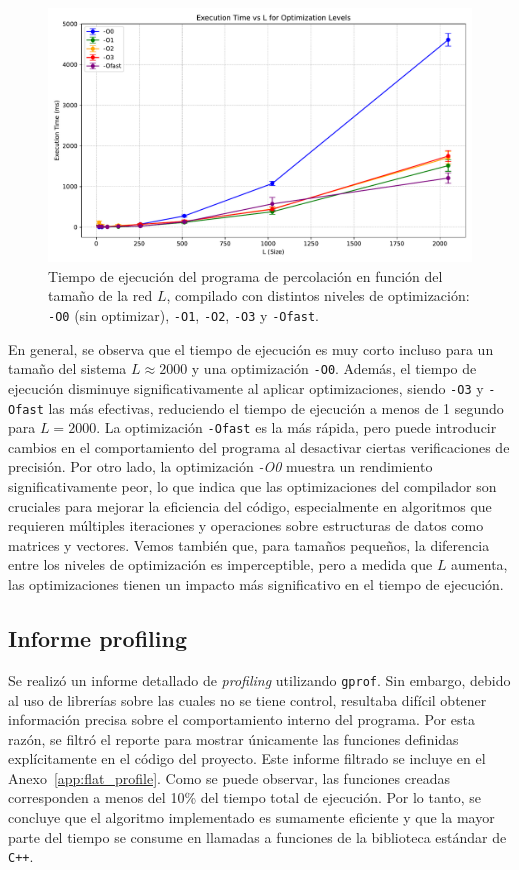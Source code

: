 \documentclass{article}
\begin{document}
\begin{figure}[h!]
    \centering
    \includegraphics[width=1.0\textwidth]{figures/opti_comparison.pdf}
    \caption{Tiempo de ejecución del programa de percolación en función del tamaño de la red \(L\), compilado con distintos niveles de optimización: \texttt{-O0} (sin optimizar), \texttt{-O1}, \texttt{-O2}, \texttt{-O3} y \texttt{-Ofast}.}
    \label{fig:opt_levels}
\end{figure}

En general, se observa que el tiempo de ejecución es muy corto incluso para un tamaño del sistema \(L \approx 2000\) y una optimización \texttt{-O0}. Además, el tiempo de ejecución disminuye significativamente al aplicar optimizaciones, siendo \texttt{-O3} y \texttt{-Ofast} las más efectivas, reduciendo el tiempo de ejecución a menos de 1 segundo para \(L = 2000\). La optimización \texttt{-Ofast} es la más rápida, pero puede introducir cambios en el comportamiento del programa al desactivar ciertas verificaciones de precisión. Por otro lado, la optimización \textit{-O0} muestra un rendimiento significativamente peor, lo que indica que las optimizaciones del compilador son cruciales para mejorar la eficiencia del código, especialmente en algoritmos que requieren múltiples iteraciones y operaciones sobre estructuras de datos como matrices y vectores. Vemos también que, para tamaños pequeños, la diferencia entre los niveles de optimización es imperceptible, pero a medida que \(L\) aumenta, las optimizaciones tienen un impacto más significativo en el tiempo de ejecución.

\subsection{Informe profiling}
Se realizó un informe detallado de \textit{profiling} utilizando \texttt{gprof}. Sin embargo, debido al uso de librerías sobre las cuales no se tiene control, resultaba difícil obtener información precisa sobre el comportamiento interno del programa. Por esta razón, se filtró el reporte para mostrar únicamente las funciones definidas explícitamente en el código del proyecto. Este informe filtrado se incluye en el Anexo~\ref{app:flat_profile}. Como se puede observar, las funciones creadas corresponden a menos del 10\% del tiempo total de ejecución. Por lo tanto, se concluye que el algoritmo implementado es sumamente eficiente y que la mayor parte del tiempo se consume en llamadas a funciones de la biblioteca estándar de \texttt{C++}.
\end{document}
